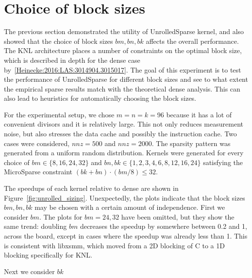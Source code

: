 \section{Choice of block sizes}

The previous section demonstrated the utility of UnrolledSparse kernel, and also showed that the choice of block sizes $bm,bn,bk$ affects the overall performance. The KNL architecture places a number of constraints on the optimal block size, which is described in depth for the dense case by~\ref{Heinecke:2016:LAS:3014904.3015017}. The goal of this experiment is to test the performance of UnrolledSparse for different block sizes and see to what extent the empirical sparse results match with the theoretical dense analysis. This can also lead to heuristics for automatically choosing the block sizes.

For the experimental setup, we chose $m=n=k=96$ because it has a lot of convenient divisors and it is relatively large. This not only reduces measurement noise, but also stresses the data cache and possibly the instruction cache. Two cases were considered, $nnz=500$ and $nnz=2000$. The sparsity pattern was generated from a uniform random distribution. Kernels were generated for every choice of $bm \in \{8,16,24,32\}$ and $bn, bk \in \{1,2,3,4,6,8,12,16,24\}$ satisfying the MicroSparse constraint $(bk+bn) \cdot (bm/8) \leq 32$. 

The speedups of each kernel relative to dense are shown in Figure~\ref{fig:unrolled_sizing}. Unexpectedly, the plots indicate that the block sizes $bm, bn, bk$ may be chosen with a certain amount of independence. First we consider $bm$. The plots for $bm=24,32$ have been omitted, but they show the same trend: doubling $bm$ decreases the speedup by somewhere between 0.2 and 1, across the board, except in cases where the speedup was already less than 1. This is consistent with libxsmm, which moved from a 2D blocking of C to a 1D blocking specifically for KNL. 

Next we consider $bk$


